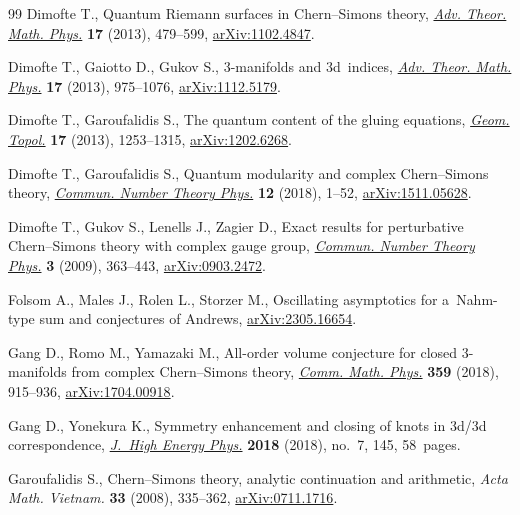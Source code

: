 \documentclass[pdftex]{sigma}
\numberwithin{equation}{section}
\begin{document}
\begin{thebibliography}{99}
Dimofte T., Quantum {R}iemann surfaces in {C}hern--{S}imons theory,
  \href{https://doi.org/10.4310/atmp.2013.v17.n3.a1}{\textit{Adv. Theor. Math. Phys.}} \textbf{17} (2013), 479--599,
  \href{https://arxiv.org/abs/1102.4847}{arXiv:1102.4847}.

Dimofte T., Gaiotto D., Gukov S., 3-manifolds and 3d~indices, \href{https://doi.org/10.4310/atmp.2013.v17.n5.a3}{\textit{Adv.
  Theor. Math. Phys.}} \textbf{17} (2013), 975--1076, \href{https://arxiv.org/abs/1112.5179}{arXiv:1112.5179}.

Dimofte T., Garoufalidis S., The quantum content of the gluing equations,
  \href{https://doi.org/10.2140/gt.2013.17.1253}{\textit{Geom. Topol.}} \textbf{17} (2013), 1253--1315, \href{https://arxiv.org/abs/1202.6268}{arXiv:1202.6268}.

Dimofte T., Garoufalidis S., Quantum modularity and complex {C}hern--{S}imons
  theory, \href{https://doi.org/10.4310/CNTP.2018.v12.n1.a1}{\textit{Commun. Number Theory Phys.}} \textbf{12} (2018), 1--52,
  \href{https://arxiv.org/abs/1511.05628}{arXiv:1511.05628}.

Dimofte T., Gukov S., Lenells J., Zagier D., Exact results for perturbative
  {C}hern--{S}imons theory with complex gauge group, \href{https://doi.org/10.4310/CNTP.2009.v3.n2.a4}{\textit{Commun. Number
  Theory Phys.}} \textbf{3} (2009), 363--443, \href{https://arxiv.org/abs/0903.2472}{arXiv:0903.2472}.

Folsom A., Males J., Rolen L., Storzer M., Oscillating asymptotics for
  a~{N}ahm-type sum and conjectures of {A}ndrews, \href{https://arxiv.org/abs/2305.16654}{arXiv:2305.16654}.

Gang D., Romo M., Yamazaki M., All-order volume conjecture for closed
  3-manifolds from complex {C}hern--{S}imons theory, \href{https://doi.org/10.1007/s00220-018-3115-y}{\textit{Comm. Math. Phys.}}
  \textbf{359} (2018), 915--936, \href{https://arxiv.org/abs/1704.00918}{arXiv:1704.00918}.

Gang D., Yonekura K., Symmetry enhancement and closing of knots in 3d/3d
  correspondence, \href{https://doi.org/10.1007/jhep07(2018)145}{\textit{J.~High Energy Phys.}} \textbf{2018} (2018), no.~7,
  145, 58~pages.

Garoufalidis S., {C}hern--{S}imons theory, analytic continuation and
  arithmetic, \textit{Acta Math. Vietnam.} \textbf{33} (2008), 335--362,
  \href{https://arxiv.org/abs/0711.1716}{arXiv:0711.1716}.


\end{thebibliography}
\end{document}
